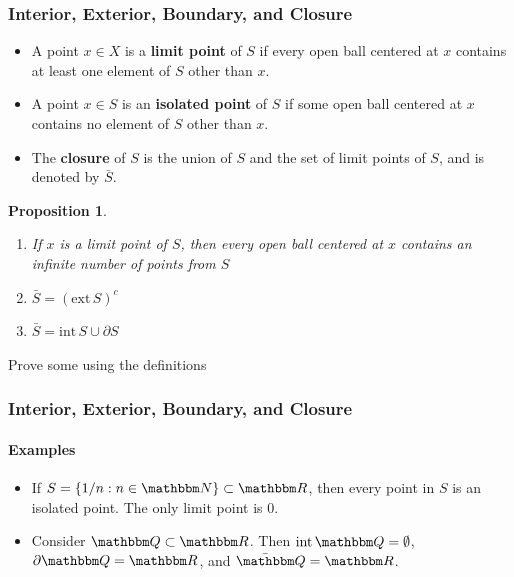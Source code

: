 \documentclass[9pt,aspectratio=169]{beamer}
\newcommand{\RR}{\mathbbm R}
\newcommand{\QQ}{\mathbbm Q}
\newcommand{\NN}{\mathbbm N}
\newcommand{\interior}{\text{int}\,}
\newtheorem{proposition}[theorem]{Proposition}
\begin{document}
\begin{frame}[allowframebreaks]
    \frametitle{Interior, Exterior, Boundary, and Closure}
    \begin{definition}
        \begin{itemize}
            \item A point $x \in X$ is a \textbf{limit point} of $S$ if every
            open ball centered at $x$ contains at least one element of $S$
            other than $x$.
            \item A point $x \in S$ is an \textbf{isolated point} of $S$ if
            some open ball centered at $x$ contains no element of $S$ other
            than $x$.
            \item The \textbf{closure} of $S$ is the union of $S$ and the set
            of limit points of $S$, and is denoted by $\bar S$.
        \end{itemize}
    \end{definition}
    \framebreak
    \begin{proposition}
        \begin{enumerate}
            \item If $x$ is a limit point of $S$, then every open ball
            centered at $x$ contains an infinite number of points from $S$
            \item $\bar S = (\text{ext}\, S)^c$
            \item $\bar S = \interior S \cup \partial S$ 
        \end{enumerate}
    \end{proposition}
    Prove some using the definitions
\end{frame}

\begin{frame}
    \frametitle{Interior, Exterior, Boundary, and Closure}
    \framesubtitle{Examples}
    \begin{itemize}
        \item If $S = \{1/n: n \in \NN\} \subset \RR$, then every point in
        $S$ is an isolated point. The only limit point is 0.
        \item Consider $\QQ \subset \RR$. Then $\interior \QQ = \emptyset$,
        $\partial \QQ = \RR$, and $\bar \QQ = \RR$.
    \end{itemize}
\end{frame}
\end{document}

